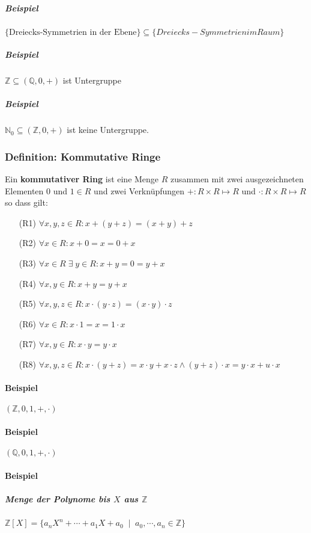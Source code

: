 \documentclass[14pt,a4paper]{article}
\newcommand{\N}{\ensuremath{\mathbb{N}}}
\newcommand{\Z}{\ensuremath{\mathbb{Z}}}
\newcommand{\Q}{\ensuremath{\mathbb{Q}}}
\newcommand{\Nzero}{\ensuremath{\N_0}}
\begin{document}
  \subparagraph{Beispiel}
  $\{\text{Dreiecks-Symmetrien in der Ebene}\} \subseteq \{Dreiecks-Symmetrien im
  Raum\}$
  \subparagraph{Beispiel}
  $\Z \subseteq (\Q, 0, +)$ ist Untergruppe

  \subparagraph{Beispiel}
  $\Nzero \subseteq (\Z, 0, +)$ ist keine Untergruppe.

  \subsubsection{Definition: Kommutative Ringe}
  Ein \textbf{kommutativer Ring} ist eine Menge $R$ zusammen mit zwei
  ausgezeichneten Elementen $0$ und $1 \in R$ und zwei Verknüpfungen $ + : R \times R \mapsto R$ und $\cdot : R \times R \mapsto R$ so dass gilt:

  \begin{enumerate}
    \item[(R1)] $ \forall x,y,z \in R:   x + (y + z) = (x + y) + z $
    \item[(R2)] $ \forall x \in R: x + 0 = x = 0 + x $
    \item[(R3)] $ \forall x \in R \;\exists\; y \in R : x + y = 0 = y + x $
    \item[(R4)] $ \forall x,y \in R : x + y = y + x $
    \item[(R5)] $ \forall x,y,z \in R : x \cdot (y \cdot z) = (x \cdot y) \cdot
      z $
    \item[(R6)] $ \forall x \in R : x \cdot 1 = x = 1 \cdot x $
    \item[(R7)] $ \forall x,y \in R: x \cdot y = y \cdot x $
    \item[(R8)] $ \forall x,y,z \in R : x \cdot (y + z) = x \cdot y + x \cdot z
      \land ( y + z) \cdot x = y \cdot x + u \cdot x $
  \end{enumerate}

  \paragraph{Beispiel}
  $(\Z, 0, 1, +, \cdot)$

  \paragraph{Beispiel}
  $(\Q, 0, 1, +, \cdot)$


  \paragraph{Beispiel}
  \subparagraph{Menge der Polynome bis $X$ aus $\Z$}
  $ \Z [ X ] = \{ a_nX^n + \dotsb + a_1X+a_0 \;\;|\;\; a_0, \dotsb, a_n \in \Z
  \} $
\end{document}
